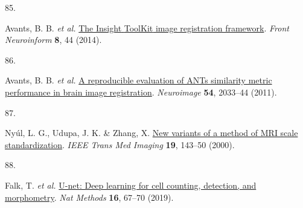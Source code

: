 \documentclass[
  12pt,
]{article}
\newlength{\cslhangindent}
\newlength{\csllabelwidth}
\newenvironment{CSLReferences}[2] %
 {\begin{list}{}{%
  \setlength{\itemindent}{0pt}
  \setlength{\leftmargin}{0pt}
  \setlength{\parsep}{0pt}
  \ifodd #1
   \setlength{\leftmargin}{\cslhangindent}
   \setlength{\itemindent}{-1\cslhangindent}
  \fi
  \setlength{\itemsep}{#2\baselineskip}}}
 {\end{list}}
\newcommand{\CSLLeftMargin}[1]{\parbox[t]{\csllabelwidth}{\strut#1\strut}}
\newcommand{\CSLRightInline}[1]{\parbox[t]{\linewidth - \csllabelwidth}{\strut#1\strut}}
\begin{document}
\begin{CSLReferences}{0}{0}
\CSLLeftMargin{85. }%
\CSLRightInline{Avants, B. B. \emph{et al.}
\href{https://doi.org/10.3389/fninf.2014.00044}{The {Insight} {ToolKit}
image registration framework}. \emph{Front Neuroinform} \textbf{8}, 44
(2014).}

\CSLLeftMargin{86. }%
\CSLRightInline{Avants, B. B. \emph{et al.}
\href{https://doi.org/10.1016/j.neuroimage.2010.09.025}{A reproducible
evaluation of ANTs similarity metric performance in brain image
registration}. \emph{Neuroimage} \textbf{54}, 2033--44 (2011).}

\CSLLeftMargin{87. }%
\CSLRightInline{Nyúl, L. G., Udupa, J. K. \& Zhang, X.
\href{https://doi.org/10.1109/42.836373}{New variants of a method of MRI
scale standardization}. \emph{IEEE Trans Med Imaging} \textbf{19},
143--50 (2000).}

\CSLLeftMargin{88. }%
\CSLRightInline{Falk, T. \emph{et al.}
\href{https://doi.org/10.1038/s41592-018-0261-2}{U-net: Deep learning
for cell counting, detection, and morphometry}. \emph{Nat Methods}
\textbf{16}, 67--70 (2019).}

\end{CSLReferences}
\end{document}

